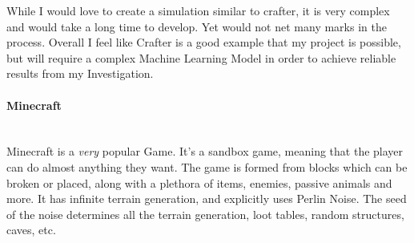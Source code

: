 \begin{flushleft}
                        \begin{figure}[h]
                            \centering
                            \qquad
                        \end{figure}

                        While I would love to create a simulation similar to crafter, it is very complex and would take a long time to develop. Yet
                        would not net many marks in the process. Overall I feel like Crafter is a good example that my project is possible, but will
                        require a complex Machine Learning Model in order to achieve reliable results from my Investigation.

                \paragraph{Minecraft} \mbox{} \\
                    \vspace{0.2cm}
                    Minecraft is a \textit{very} popular Game. It's a sandbox game, meaning that the player can do almost anything they want.
                    The game is formed from blocks which can be broken or placed, along with a plethora of items, enemies, passive animals
                    and more. It has infinite terrain generation, and explicitly uses Perlin Noise. The seed of the noise determines
                    all the terrain generation, loot tables, random structures, caves, etc. \\
                    

\end{flushleft}
